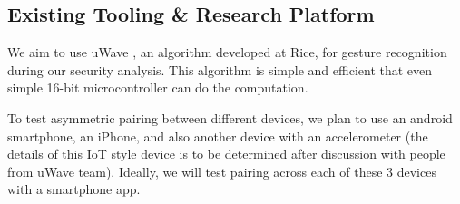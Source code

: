 
\subsection{Existing Tooling \& Research Platform}
\label{sec:Tooling}

We aim to use uWave \cite{Liu:2009, LiuuWave}, an algorithm developed at Rice, for gesture recognition during our security analysis. This algorithm is simple and efficient that even simple 16-bit microcontroller can do the computation. 

To test asymmetric pairing between different devices, we plan to use an android smartphone, an iPhone, and also another device with an accelerometer (the details of this \gls{IoT} style device is to be determined after discussion with people from uWave team). Ideally, we will test pairing across each of these 3 devices with a smartphone app.
